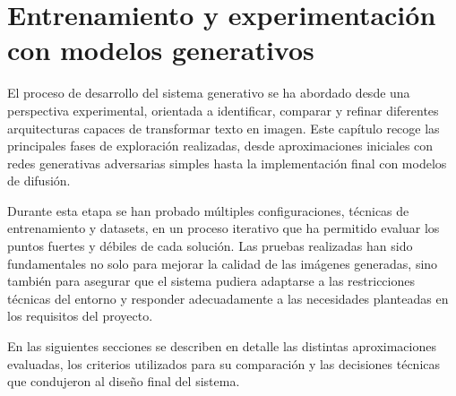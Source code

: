 \section{Entrenamiento y experimentación con modelos generativos}
El proceso de desarrollo del sistema generativo se ha abordado desde una perspectiva experimental, orientada a identificar, comparar y refinar diferentes arquitecturas capaces de transformar texto en imagen. Este capítulo recoge las principales fases de exploración realizadas, desde aproximaciones iniciales con redes generativas adversarias simples hasta la implementación final con modelos de difusión.

Durante esta etapa se han probado múltiples configuraciones, técnicas de entrenamiento y datasets, en un proceso iterativo que ha permitido evaluar los puntos fuertes y débiles de cada solución. Las pruebas realizadas han sido fundamentales no solo para mejorar la calidad de las imágenes generadas, sino también para asegurar que el sistema pudiera adaptarse a las restricciones técnicas del entorno y responder adecuadamente a las necesidades planteadas en los requisitos del proyecto.

En las siguientes secciones se describen en detalle las distintas aproximaciones evaluadas, los criterios utilizados para su comparación y las decisiones técnicas que condujeron al diseño final del sistema.





